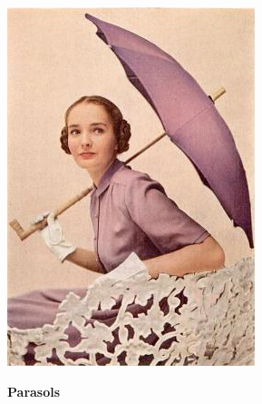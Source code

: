 \begin{minipage}{\textwidth}
\begin{minipage}[b][\textheight][b]{.47\linewidth}
\vspace*{2cm}

\includegraphics[width=\linewidth]{./images/parasol-03.jpg}\par
\vspace{2\baselineskip}

\centerline{\bfseries\Huge Parasols}
\vspace{2\baselineskip}

\begin{quote}
\lipsum[2]
\end{quote}

\vfill


\end{minipage}
\end{minipage}
